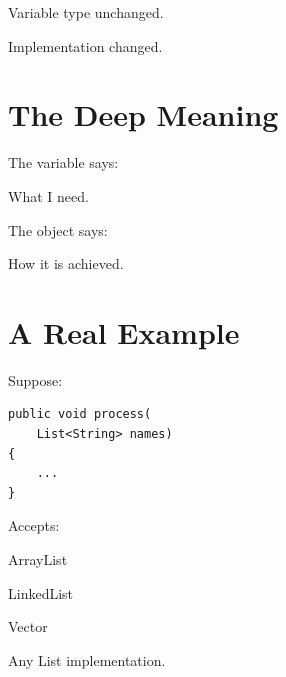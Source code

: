 \documentclass[11pt,a4paper]{book}
\begin{document}

Variable type unchanged.


Implementation changed.


\section{The Deep Meaning}

The variable says:


What I need.


The object says:


How it is achieved.


\section{A Real Example}

Suppose:

\begin{verbatim} 
public void process(
    List<String> names)
{
    ...
}
\end{verbatim}


Accepts:


ArrayList


LinkedList


Vector


Any List implementation.

\end{document}
